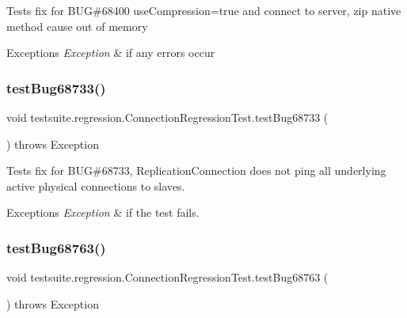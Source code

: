 Tests fix for B\+UG\#68400 use\+Compression=true and connect to server, zip native method cause out of memory


\begin{DoxyExceptions}{Exceptions}
{\em Exception} & if any errors occur \\
\hline
\end{DoxyExceptions}
\mbox{\label{classtestsuite_1_1regression_1_1_connection_regression_test_a9d54ba5c540e24424893bc15c83312ac}} 
\subsubsection{\texorpdfstring{test\+Bug68733()}{testBug68733()}}
{\footnotesize\ttfamily void testsuite.\+regression.\+Connection\+Regression\+Test.\+test\+Bug68733 (\begin{DoxyParamCaption}{ }\end{DoxyParamCaption}) throws Exception}

Tests fix for B\+UG\#68733, Replication\+Connection does not ping all underlying active physical connections to slaves.


\begin{DoxyExceptions}{Exceptions}
{\em Exception} & if the test fails. \\
\hline
\end{DoxyExceptions}
\mbox{\label{classtestsuite_1_1regression_1_1_connection_regression_test_ad20cb3d4d184371c5cbf7e540726e6a6}} 
\subsubsection{\texorpdfstring{test\+Bug68763()}{testBug68763()}}
{\footnotesize\ttfamily void testsuite.\+regression.\+Connection\+Regression\+Test.\+test\+Bug68763 (\begin{DoxyParamCaption}{ }\end{DoxyParamCaption}) throws Exception}

